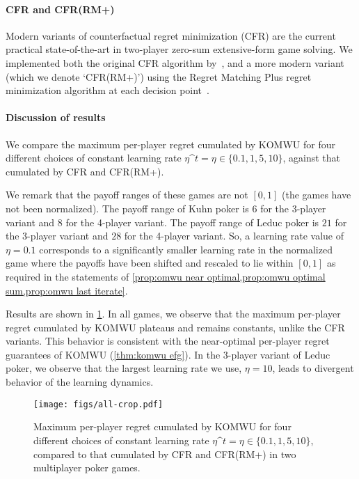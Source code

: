 \paragraph{CFR and CFR(RM+)} Modern variants of counterfactual regret minimization (CFR) are the current practical state-of-the-art in two-player zero-sum extensive-form game solving. We implemented both the original CFR algorithm by~\citet{Zinkevich07:Regret}, and a more modern variant (which we denote `CFR(RM+)') using the Regret Matching Plus regret minimization algorithm at each decision point~\citep{Tammelin15:Solving}.

\paragraph{Discussion of results}
We compare the maximum per-player regret cumulated by KOMWU for four different choices of constant learning rate $\eta\^t = \eta \in \{ 0.1, 1, 5, 10\}$, against that cumulated by CFR and CFR(RM+).

We remark that the payoff ranges of these games are not $[0,1]$ (\ie the games have not been normalized). The payoff range of Kuhn poker is $6$ for the 3-player variant and $8$ for the 4-player variant. The payoff range of Leduc poker is $21$ for the 3-player variant and $28$ for the 4-player variant. So, a learning rate value of $\eta=0.1$ corresponds to a significantly smaller learning rate in the normalized game where the payoffs have been shifted and rescaled to lie within $[0,1]$ as required in the statements of \cref{prop:omwu near optimal,prop:omwu optimal sum,prop:omwu last iterate}.

Results are shown in \cref{fig:all games}. In all games, we observe that the maximum per-player regret cumulated by KOMWU plateaus and remains constants, unlike the CFR variants. This behavior is consistent with the near-optimal per-player regret guarantees of KOMWU (\cref{thm:komwu efg}). In the 3-player variant of Leduc poker, we observe that the largest learning rate we use, $\eta=10$, leads to divergent behavior of the learning dynamics.

\begin{figure}[H]\centering
    \texttt{[image: figs/all-crop.pdf]}
    \caption{Maximum per-player regret cumulated by KOMWU for four different choices of constant learning rate $\eta\^t = \eta \in \{ 0.1, 1, 5, 10\}$, compared to that cumulated by CFR and CFR(RM+) in two multiplayer poker games.}
    \label{fig:all games}
\end{figure}